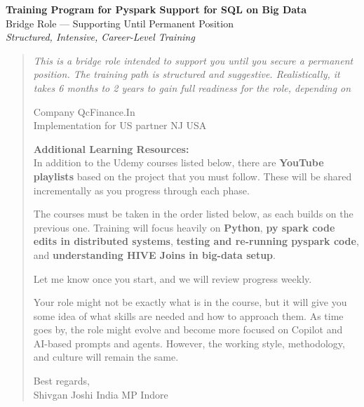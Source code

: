 \documentclass[12pt]{article}
\begin{document}
	
	\begin{center}
		{\Huge\bfseries Training Program for Pyspark Support for SQL on Big Data} \\[0.5cm]
		{\large Bridge Role — Supporting Until Permanent Position} \\[0.3cm]
		{\textit{Structured, Intensive, Career-Level Training}} \\[1cm]
	\end{center}
	
	\begin{quote}
		\emph{This is a bridge role intended to support you until you secure a permanent position. The training path is structured and suggestive. Realistically, it takes 6 months to 2 years to gain full readiness for the role, depending on}
		
		\vspace{0.3cm}
		
		Company QcFinance.In \\
		Implementation for US partner NJ USA
		
		\vspace{0.3cm}
		
		\textbf{Additional Learning Resources:} \\
		In addition to the Udemy courses listed below, there are \textbf{YouTube playlists} based on the project that you must follow. These will be shared incrementally as you progress through each phase.
		
		\vspace{0.3cm}
		
		The courses must be taken in the order listed below, as each builds on the previous one. Training will focus heavily on \textbf{Python}, \textbf{py spark code edits in distributed systems}, \textbf{testing and re-running pyspark code}, and \textbf{understanding HIVE Joins in big-data setup}.
		
		Let me know once you start, and we will review progress weekly.
		
		Your role might not be exactly what is in the course, but it will give you some idea of what skills are needed and how to approach them. As time goes by, the role might evolve and become more focused on Copilot and AI-based prompts and agents. However, the working style, methodology, and culture will remain the same.
		
		Best regards, \\
		Shivgan Joshi India MP Indore
	\end{quote}
	
\end{document}
